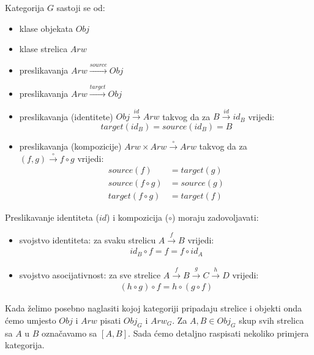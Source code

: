   \begin{definition}
    Kategorija $G$ sastoji se od:
    \begin{itemize}
      \item klase objekata $Obj$
      \item klase strelica $Arw$
      \item preslikavanja $Arw \xrightarrow{source} Obj$
      \item preslikavanja $Arw \xrightarrow{target} Obj$
      \item preslikavanja (identitete) $Obj \xrightarrow{id} Arw$ takvog da
      za $B \xrightarrow{id} id_B$ vrijedi:
        \begin{equation}
          target(id_B) = source(id_B) = B
        \end{equation}
      \item preslikavanja (kompozicije) $Arw \times Arw \xrightarrow{\circ}
      Arw$ takvog da za \\ $(f, g) \xrightarrow{\circ} f \circ g$ vrijedi:
        \begin{align}
          source(f) &= target(g) \\
          source(f \circ g) &= source(g) \\
          target(f \circ g) &= target(f)
        \end{align}
    \end{itemize}
    Preslikavanje identiteta ($id$) i kompozicija ($\circ$) moraju
    zadovoljavati:
    \begin{itemize}
      \item svojstvo identiteta: za svaku strelicu $A \xrightarrow{f} B$ vrijedi:
        \begin{align}
          id_B \circ f = f = f \circ id_A
        \end{align}
      \item svojstvo asocijativnost: za sve strelice $A \xrightarrow{f} B
      \xrightarrow{g} C \xrightarrow{h} D$ vrijedi:
        \begin{align} \label{def:kat_assoc}
          (h \circ g) \circ f = h \circ (g \circ f)
        \end{align}
    \end{itemize}
  \end{definition}
  Kada želimo posebno naglasiti kojoj kategoriji pripadaju strelice i objekti
  onda ćemo umjesto $Obj$ i $Arw$ pisati $Obj_G$ i $Arw_G$.
  Za $A, B \in Obj_G$ skup svih strelica sa $A$ u $B$ označavamo sa
  $[A, B]$.
  Sada ćemo detaljno raspisati nekoliko primjera kategorija.

